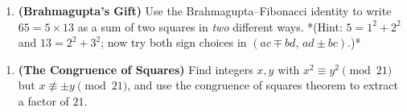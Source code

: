 \begin{enumerate}[leftmargin=*]
\item \textbf{(Brahmagupta's Gift)} Use the Brahmagupta–Fibonacci identity to write $65 = 5 \times 13$ as a sum of two squares in \textit{two} different ways. *(Hint: $5 = 1^2 + 2^2$ and $13 = 2^2 + 3^2$; now try both sign choices in $(ac \mp bd, \, ad \pm bc)$.)*
\end{enumerate}

\begin{enumerate}[leftmargin=*]
\item \textbf{(The Congruence of Squares)} Find integers $x, y$ with $x^2 \equiv y^2 \pmod{21}$ but $x \not\equiv \pm y \pmod{21}$, and use the congruence of squares theorem to extract a factor of $21$.
\end{enumerate}

